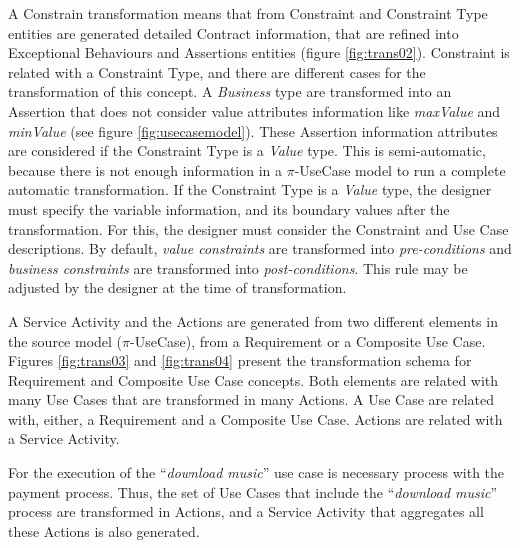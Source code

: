 A {\sc Constrain} transformation means that from {\sc Constraint} and {\sc
Constraint Type} entities are generated detailed {\sc Contract} information,
that are refined into {\sc Exceptional Behaviours} and {\sc Assertions} entities
(figure \ref{fig:trans02}). {\sc Constraint} is related with a {\sc Constraint Type}, and there are
different cases for the transformation of this concept. A \textit{Business}
type are transformed into an {\sc Assertion} that does not consider value
attributes information like \textit{maxValue} and \textit{minValue} (see figure \ref{fig:usecasemodel}). These {\sc Assertion} information
attributes are considered if the {\sc Constraint Type} is a \textit{Value}
type. This is semi-automatic, because there is not enough
information in a $\pi$-UseCase model to run a complete automatic transformation.
If the {\sc Constraint Type} is a \textit{Value} type, the designer must specify
the variable information, and its boundary values after the transformation. For this, the designer must consider the {\sc Constraint} and {\sc Use
Case} descriptions. By default, \textit{value constraints} are transformed into
\textit{pre-conditions} and  \textit{business constraints} are transformed into
\textit{post-conditions}. This rule may be adjusted by the designer at the time
of transformation.

A {\sc Service Activity} and the {\sc Actions} are generated from two different
elements in the source model ($\pi$-UseCase), from a {\sc Requirement} or a {\sc
Composite Use Case}. Figures \ref{fig:trans03} and \ref{fig:trans04} present
the transformation schema for {\sc Requirement} and {\sc
Composite Use Case} concepts. Both elements are related with many {\sc Use
Cases} that are transformed in many {\sc Actions}. A {\sc Use Case} are related
with, either, a {\sc Requirement} and a {\sc Composite Use Case}. {\sc Actions}
are related with a {\sc Service Activity}. 

\begin{exampl}
For the execution of the ``\textit{download music}'' use case is necessary
process with the payment process. Thus, the set of {\sc Use Cases} that include the ``\textit{download
music}'' process are transformed in {\sc Actions}, and a {\sc Service Activity}
that aggregates all these {\sc Actions} is also generated. 
\end{exampl}



